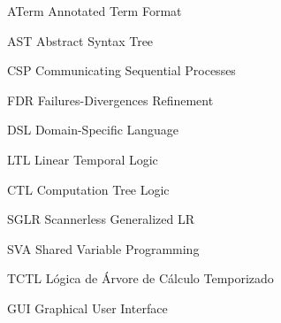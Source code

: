 \begin{siglas}
  \item[ATerm] Annotated Term Format
  \item[AST] Abstract Syntax Tree
  \item[CSP] Communicating Sequential Processes	
  \item[FDR] Failures-Divergences Refinement
  \item[DSL] Domain-Specific Language
  \item[LTL] Linear Temporal Logic
  \item[CTL] Computation Tree Logic
  \item[SGLR] Scannerless Generalized LR
  \item[SVA] Shared Variable Programming
  \item[TCTL] Lógica de Árvore de Cálculo Temporizado
  \item[GUI] Graphical User Interface
\end{siglas}